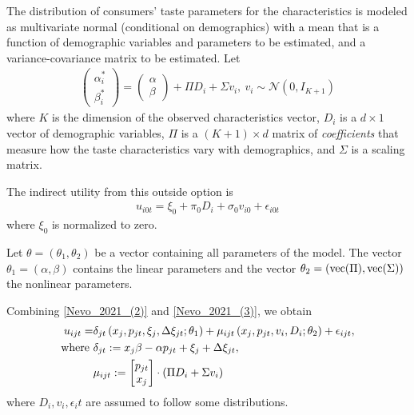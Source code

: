 \documentclass[11pt]{elegantbook}
\begin{document}
The distribution of consumers' taste parameters for the characteristics is modeled as multivariate normal (conditional on demographics) with a mean that is a function of demographic variables and parameters to be estimated, and a variance-covariance matrix to be estimated. Let
\begin{equation}
    \begin{aligned}
        \begin{pmatrix}
            \alpha_i^*\\
            \beta_i^*
        \end{pmatrix}
        =
        \begin{pmatrix}
            \alpha\\
            \beta
        \end{pmatrix}
        +\Pi D_i + \Sigma v_i,\ v_i\sim \mathcal{N}(0,I_{K+1})
    \end{aligned}
    \label{Nevo_2021_(3)}
\end{equation}
where $K$ is the dimension of the observed characteristics vector, $D_i$ is a $d \times 1$ vector of demographic variables, $\Pi$ is a $(K+1)\times d$ matrix of \textit{coefficients} that measure how the taste characteristics vary with demographics, and $\Sigma$ is a scaling matrix.

The indirect utility from this outside option is
\begin{equation}
    \begin{aligned}
        u_{i0t}=\xi_0+\pi_0 D_i+\sigma_0 v_{i0}+\epsilon_{i0t}
    \end{aligned}
    \nonumber
\end{equation}
where $\xi_0$ is normalized to zero.

Let $\theta=(\theta_1,\theta_2)$ be a vector containing all parameters of the model. The vector $\theta_1=(\alpha,\beta)$ contains the linear parameters and the vector $\theta_2=(\textnormal{vec}(\Pi),\textnormal{vec}(\Sigma))$ the nonlinear parameters.

Combining \eqref{Nevo_2021_(2)} and \eqref{Nevo_2021_(3)}, we obtain
\begin{equation}
    \begin{aligned}
        u_{ijt}=&\delta_{jt}\left(x_j,p_{jt},\xi_j,\Delta\xi_{jt};\theta_1\right)+\mu_{ijt}\left(x_j,p_{jt},v_i,D_i;\theta_2\right)+\epsilon_{ijt},\\
        \textnormal{where }&\delta_{jt}:=x_j\beta - \alpha p_{jt} + \xi_j +\Delta\xi_{jt},\\
        &\mu_{ijt}:=
        \begin{bmatrix}
            p_{jt}\\
            x_j
        \end{bmatrix}\cdot \left(\Pi D_i + \Sigma v_i\right)
    \end{aligned}
    \label{Nevo_2021_(4)}
\end{equation}
where $D_i,v_i,\epsilon_it$ are assumed to follow some distributions.
\end{document}
